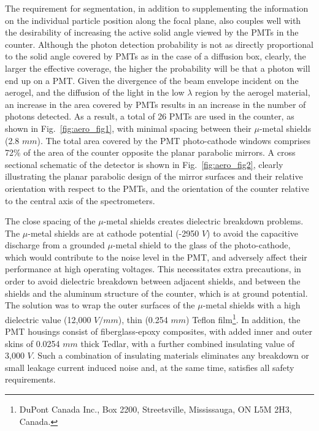 {The requirement for segmentation, in addition to supplementing the information
on the individual particle position along the focal plane, also couples well
with the desirability of increasing the active solid angle viewed by the PMTs
in the counter.  Although the photon detection probability is not as directly
proportional to the solid angle covered by PMTs as in the case of a diffusion
box, clearly, the larger the effective coverage, the higher the probability
will be that a photon will end up on a PMT.  Given the divergence of the beam
envelope incident on the aerogel, and the diffusion of the light in the low
$\lambda$ region by the aerogel material, an increase in the area covered by
PMTs results in an increase in the number of photons detected.  
As a result, a total of 26 PMTs are used in the counter, as shown in 
Fig.~\ref{fig:aero_fig1}, with minimal spacing between their $\mu$-metal shields 
(2.8 $mm$).  
The total area covered by the PMT photo-cathode windows comprises 72\% of the area 
of the counter opposite the planar parabolic mirrors.  
A cross sectional schematic of the detector is shown in Fig.~\ref{fig:aero_fig2}, 
clearly illustrating the planar parabolic design of the mirror surfaces and their 
relative orientation with respect to the PMTs, and the orientation of the counter 
relative to the central axis of the spectrometers. 
   
The close spacing of the $\mu$-metal shields
creates dielectric breakdown problems.  The $\mu$-metal
shields are at cathode potential (-2950 $V$) to avoid the capacitive discharge
from a grounded $\mu$-metal shield to the glass of the photo-cathode, which
would contribute to the noise level in the PMT, and adversely affect their
performance at high operating voltages. This necessitates extra precautions, in
order to avoid dielectric breakdown between adjacent shields, and between the
shields and the aluminum structure of the counter, which is at ground
potential. The solution was to wrap the outer surfaces of the $\mu$-metal
shields with a high dielectric value (12,000 $V/mm$), thin (0.254 $mm$) Teflon
film\footnote{DuPont Canada Inc., Box 2200, Streetsville, Mississauga, ON L5M 2H3, Canada.}.
  In addition, the PMT housings consist of fiberglass-epoxy composites, 
with added inner and outer skins of 0.0254 $mm$ thick Tedlar\footnotemark[1],
with a further combined insulating value of 3,000 $V$.  
Such a combination of insulating materials eliminates any breakdown or small leakage
current induced noise and, at the same time, satisfies all safety requirements.

}
